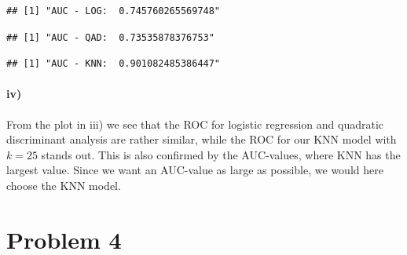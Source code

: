 \documentclass[
]{article}
\newenvironment{Shaded}{\begin{snugshade}}{\end{snugshade}}
\newcommand{\FunctionTok}[1]{\textcolor[rgb]{0.00,0.00,0.00}{#1}}
\newcommand{\NormalTok}[1]{#1}
\newcommand{\SpecialCharTok}[1]{\textcolor[rgb]{0.00,0.00,0.00}{#1}}
\newcommand{\StringTok}[1]{\textcolor[rgb]{0.31,0.60,0.02}{#1}}
\begin{document}
\begin{Shaded}
\end{Shaded}

\begin{verbatim}
## [1] "AUC - LOG:  0.745760265569748"
\end{verbatim}

\begin{Shaded}
\end{Shaded}

\begin{verbatim}
## [1] "AUC - QAD:  0.73535878376753"
\end{verbatim}

\begin{Shaded}
\end{Shaded}

\begin{verbatim}
## [1] "AUC - KNN:  0.901082485386447"
\end{verbatim}

\hypertarget{iv}{%
\paragraph{iv)}\label{iv}}

From the plot in iii) we see that the ROC for logistic regression and
quadratic discriminant analysis are rather similar, while the ROC for
our KNN model with \(k=25\) stands out. This is also confirmed by the
AUC-values, where KNN has the largest value. Since we want an AUC-value
as large as possible, we would here choose the KNN model.

\hypertarget{problem-4}{%
\section{Problem 4}\label{problem-4}}
\end{document}
